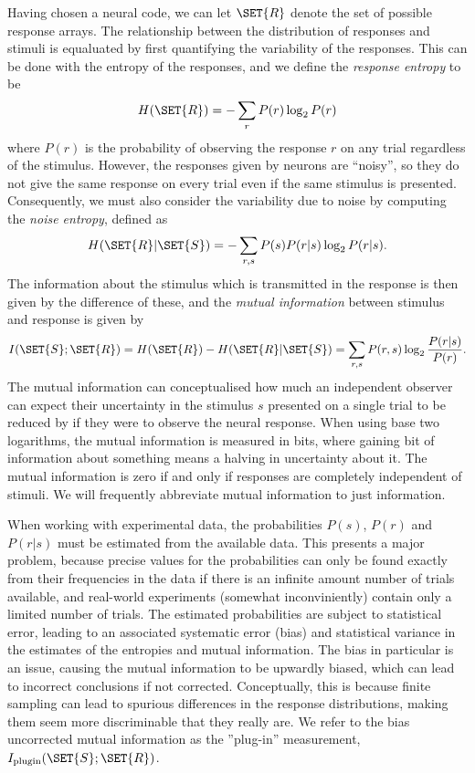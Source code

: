 Having chosen a neural code, we can let $\SET{R}$ denote the set of possible response arrays.
The relationship between the distribution of responses and stimuli is equaluated by first quantifying the variability of the responses.
This can be done with the entropy \cite{Shannon1948} of the responses, and we define the \textit{response entropy} to be
\begin{equation}
H( \SET{R} )
= - \sum_{r} P(r) \log_2 P(r)
\end{equation}
where $P(r)$ is the probability of observing the response $r$ on any trial regardless of the stimulus.
However, the responses given by neurons are ``noisy'', so they do not give the same response on every trial even if the same stimulus is presented.
Consequently, we must also consider the variability due to noise by computing the \textit{noise entropy}, defined as
\begin{equation}
H( \SET{R} | \SET{S} )
= - \sum_{r,s} P(s) P(r|s) \log_2 P(r|s)
.\end{equation}
The information about the stimulus which is transmitted in the response is then given by the difference of these, and the \textit{mutual information} between stimulus and response is given by
\begin{equation}
I( \SET{S} ; \SET{R} )
= H( \SET{R} ) - H( \SET{R} | \SET{S} )
= \sum_{r,s} P(r,s) \log_2 \frac{P(r|s)}{P(r)}
.\end{equation}
The mutual information can conceptualised how much an independent observer can expect their uncertainty in the stimulus $s$ presented on a single trial to be reduced by if they were to observe the neural response. When using base two logarithms, the mutual information is measured in bits, where gaining \unit[1]{bit} of information about something means a halving in uncertainty about it.
The mutual information is zero if and only if responses are completely independent of stimuli.
We will frequently abbreviate mutual information to just information.

When working with experimental data, the probabilities $P(s)$, $P(r)$ and $P(r|s)$ must be estimated from the available data.
This presents a major problem, because precise values for the probabilities can only be found exactly from their frequencies in the data if there is an infinite amount number of trials available, and real-world experiments (somewhat inconviniently) contain only a limited number of trials.
The estimated probabilities are subject to statistical error, leading to an associated systematic error (bias) and statistical variance in the estimates of the entropies and mutual information. The bias in particular is an issue, causing the mutual information to be upwardly biased, which can lead to incorrect conclusions if not corrected. Conceptually, this is because finite sampling can lead to spurious differences in the response distributions, making them seem more discriminable that they really are.
We refer to the bias uncorrected mutual information as the ''plug-in'' measurement, $I_{\text{plugin}}(\SET{S};\SET{R})$.

